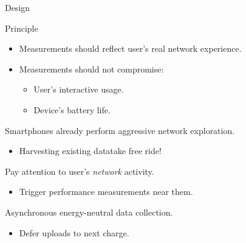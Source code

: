 \begin{frame}{\PS{} Design}
  \begin{block}{Principle}
    \begin{itemize}
      \item Measurements should reflect user's real network experience.
      \item Measurements should not compromise:
      \begin{itemize}
        \item User's interactive usage.
        \item Device's battery life.
      \end{itemize}
  \end{itemize}
  \end{block}
  Smartphones already perform aggressive network exploration.
  \begin{itemize}
    \item Harvesting existing data\textendash take free ride!
  \end{itemize}
  Pay attention to user's \textit{network} activity.
  \begin{itemize}
    \item Trigger performance measurements near them.
  \end{itemize}
  Asynchronous energy-neutral data collection.
  \begin{itemize}
    \item Defer uploads to next charge.
  \end{itemize}
\end{frame}


